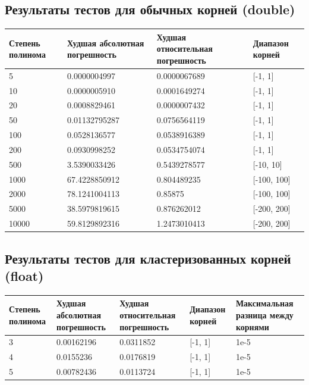 \documentclass[a4paper,12pt]{article}
\begin{document}
\subsection{Результаты тестов для обычных корней (double)}
\begin{center}
  \begin{tabular}{|p{4.0cm}|p{4.0cm}|p{4.0cm}|p{3.0cm}|}
  \hline
  \textbf{Степень полинома}  &  \textbf{Худшая абсолютная погрешность} & \textbf{Худшая относительная погрешность} & \textbf{Диапазон корней}\\
  \hline
  5 & 0.0000004997 & 0.0000067689 & [-1, 1]\\
  \hline
  10 & 0.0000005910 & 0.0001649274 & [-1, 1]\\
  \hline
  20 & 0.0008829461 & 0.0000007432 & [-1, 1] \\
  \hline
  50 & 0.01132795287 & 0.0756564119 & [-1, 1] \\
  \hline
  100 & 0.0528136577 & 0.0538916389 & [-1, 1] \\
  \hline
  200 & 0.0930998252 & 0.0534754074 & [-1, 1] \\
  \hline
  500 & 3.5390033426 & 0.5439278577 & [-10, 10] \\
  \hline
  1000 & 67.4228850912 & 0.804489235 & [-100, 100] \\
  \hline
  2000 & 78.1241004113 & 0.85875 & [-100, 100] \\
  \hline
  5000 & 38.5979819615 & 0.876262012 & [-200, 200] \\
  \hline
  10000 & 59.8129892316 & 1.2473010413 & [-200, 200] \\
  \hline
\end{tabular}
\label{tab:my_label_2}
\end{center}

\subsection{Результаты тестов для кластеризованных корней (float)}
\begin{center}
  \begin{tabular}{|p{3.0cm}|p{3.0cm}|p{3.0cm}|p{3.0cm}|p{3.0cm}|}
  \hline
  \textbf{Степень полинома}  &  \textbf{Худшая абсолютная погрешность} & \textbf{Худшая относительная погрешность}  & \textbf{Диапазон корней} & \textbf{Максимальная разница между корнями}\\
  \hline
  3 & 0.00162196 & 0.0311852  & [-1, 1] & 1e-5\\
  \hline
  4 & 0.0155236 & 0.0176819 & [-1, 1] & 1e-5\\
  \hline
  5 & 0.00782436 & 0.0113724 & [-1, 1] & 1e-5\\
  \hline
\end{tabular}
\label{tab:my_label_2}
\end{center}
\end{document}
